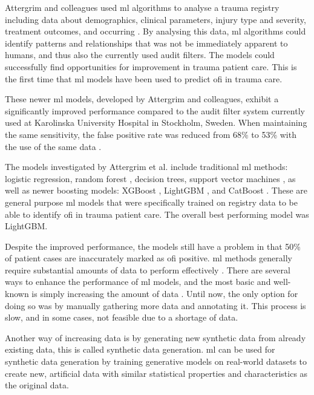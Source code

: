 \documentclass[12pt, a4paper]{article}
\begin{document}
Attergrim and colleagues used \acrshort{ml} algorithms to analyse a trauma registry including data about demographics, clinical parameters, injury type and severity, treatment outcomes, and occurring . By analysing this data, \acrshort{ml} algorithms could identify patterns and relationships that was not be immediately apparent to humans, and thus also the currently used audit filters. The models could successfully find opportunities for improvement in trauma patient care. This is the first time that \acrshort{ml} models have been used to predict \acrshort{ofi} in trauma care. \cite{attergrim_predicting_2023}

These newer \acrshort{ml} models, developed by Attergrim and colleagues, exhibit a significantly improved performance compared to the audit filter system currently used at Karolinska University Hospital in Stockholm, Sweden. When maintaining the same sensitivity, the false positive rate was reduced from 68\% to 53\% with the use of the same data \cite{attergrim_predicting_2023}.

The models investigated by Attergrim et al. \cite{attergrim_predicting_2023} include traditional \acrshort{ml} methods: logistic regression, random forest \cite{breiman_random_2001}, decision trees, support vector machines \cite{cortes_support-vector_1995}, as well as newer boosting models: XGBoost \cite{chen_xgboost_2016}, LightGBM \cite{ke_lightgbm_2017}, and CatBoost \cite{prokhorenkova_catboost_2018}. These are general purpose \acrshort{ml} models that were specifically trained on registry data to be able to identify \acrshort{ofi} in trauma patient care. The overall best performing model was LightGBM.

Despite the improved performance, the models still have a problem in that 50\% of patient cases are inaccurately marked as \acrshort{ofi} positive. \acrshort{ml} methods generally require substantial amounts of data to perform effectively \cite{piccialli_survey_2021}. There are several ways to enhance the performance of \acrshort{ml} models, and the most basic and well-known is simply increasing the amount of data \cite{greener_guide_2022}. Until now, the only option for doing so was by manually gathering more data and annotating it. This process is slow, and in some cases, not feasible due to a shortage of data.

Another way of increasing data is by generating new synthetic data from already existing data, this is called synthetic data generation. \acrshort{ml} can be used for synthetic data generation by training generative models on real-world datasets to create new, artificial data with similar statistical properties and characteristics as the original data. \cite{chen_synthetic_2021}
\end{document}
